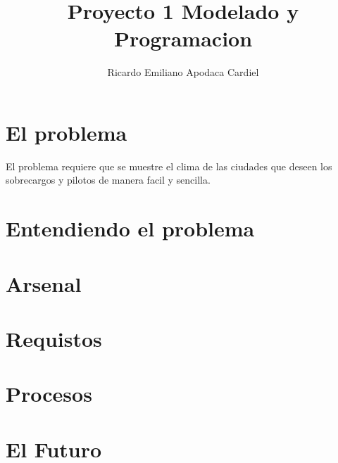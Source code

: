 \documentclass{article}
\title{Proyecto 1 Modelado y Programacion}
\author{Ricardo Emiliano Apodaca Cardiel}
\date{}
\begin{document}
    \maketitle
    \tableofcontents


    \newpage

    \section{El problema}

    El problema requiere que se muestre el clima de las ciudades que deseen los sobrecargos y pilotos de manera facil y sencilla.


    \section{Entendiendo el problema}
    \label{sec:EntProb}
    

    \section{Arsenal}
    \label{sec:Arsenal}
    
    \newpage

    \section{Requistos}
    \label{sec:Requisitos}
    
    \newpage


    \section{Procesos}
    \label{sec:Procesos}
    

    \section{El Futuro}
    
    
\end{document}
